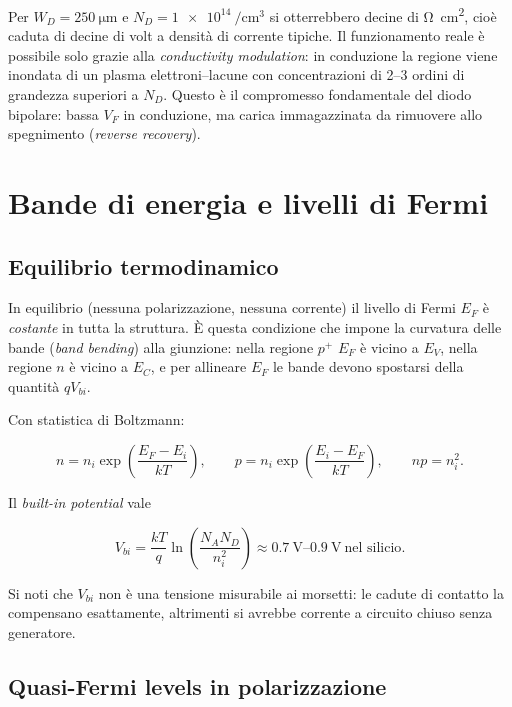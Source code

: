 Per $W_D = \SI{250}{\micro\meter}$ e $N_D = \SI{1e14}{\per\centi\meter\cubed}$
si otterrebbero decine di \si{\ohm\centi\meter\squared}, cioè caduta di decine
di volt a densità di corrente tipiche. Il funzionamento reale è possibile solo
grazie alla \emph{conductivity modulation}: in conduzione la regione viene
inondata di un plasma elettroni--lacune con concentrazioni di 2--3 ordini di
grandezza superiori a $N_D$. Questo è il compromesso fondamentale del diodo
bipolare: bassa $V_F$ in conduzione, ma carica immagazzinata da rimuovere allo
spegnimento (\emph{reverse recovery}).

\section{Bande di energia e livelli di Fermi}

\subsection{Equilibrio termodinamico}

In equilibrio (nessuna polarizzazione, nessuna corrente) il livello di Fermi
$E_F$ è \emph{costante} in tutta la struttura. È questa condizione che impone la
curvatura delle bande (\emph{band bending}) alla giunzione: nella regione $p^{+}$
$E_F$ è vicino a $E_V$, nella regione $n$ è vicino a $E_C$, e per allineare
$E_F$ le bande devono spostarsi della quantità $qV_{bi}$.

Con statistica di Boltzmann:

\begin{equation}
n = n_i \exp\!\left(\frac{E_F - E_i}{kT}\right),
\qquad
p = n_i \exp\!\left(\frac{E_i - E_F}{kT}\right),
\qquad
np = n_i^{2} .
\end{equation}

Il \emph{built-in potential} vale

\begin{equation}
V_{bi} = \frac{kT}{q} \ln\!\left(\frac{N_A N_D}{n_i^{2}}\right)
\approx \SIrange{0.7}{0.9}{\volt} \ \text{nel silicio}.
\end{equation}

Si noti che $V_{bi}$ non è una tensione misurabile ai morsetti: le cadute di
contatto la compensano esattamente, altrimenti si avrebbe corrente a
circuito chiuso senza generatore.

\subsection{Quasi-Fermi levels in polarizzazione}

